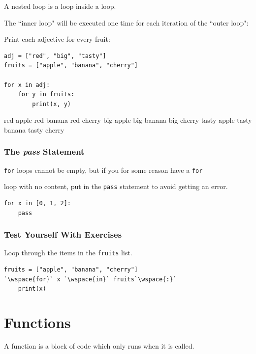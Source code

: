 \documentclass[12pt,a4paper]{article}
\newcommand{\wspace}[1]{%
	\color{white}\colorbox{white}{\texttt{#1}}%
}
\newcommand{\code}[1]{%
	\colorbox{backcolour}{\lstinline{#1}}%
}
\newcommand{\lcode}[1]{%
	\lstinline{#1}%
}
\begin{document}
A nested loop is a loop inside a loop.

The ``inner loop" will be executed one time for each iteration of the ``outer loop":

\begin{ebox}
Print each adjective for every fruit:
	\begin{lstlisting}
adj = ["red", "big", "tasty"]
fruits = ["apple", "banana", "cherry"]

for x in adj:
    for y in fruits:
        print(x, y)
	\end{lstlisting}
\tcblower
	\begin{vercode}
red apple
red banana
red cherry
big apple
big banana
big cherry
tasty apple
tasty banana
tasty cherry
	\end{vercode}
\end{ebox}
\subsubsection{The \textit{pass} Statement}

\code{for} loops cannot be empty, but if you for some reason have a \code{for}
loop with no content, put in the \code{pass} statement to avoid getting an
error.

\begin{ebox}
	\begin{lstlisting}
for x in [0, 1, 2]:
    pass
	\end{lstlisting}
\end{ebox}
\subsubsection{Test Yourself With Exercises}

\begin{tbox}
Loop through the items in the \lcode{fruits} list.
	\begin{lstlisting}[numbers=none]
fruits = ["apple", "banana", "cherry"]
`\wspace{for}` x `\wspace{in}` fruits`\wspace{:}`
    print(x)
	\end{lstlisting}
\end{tbox}
\vfill\newpage
\section{Functions}\label{pyFunction}

A function is a block of code which only runs when it is called.
\end{document}
